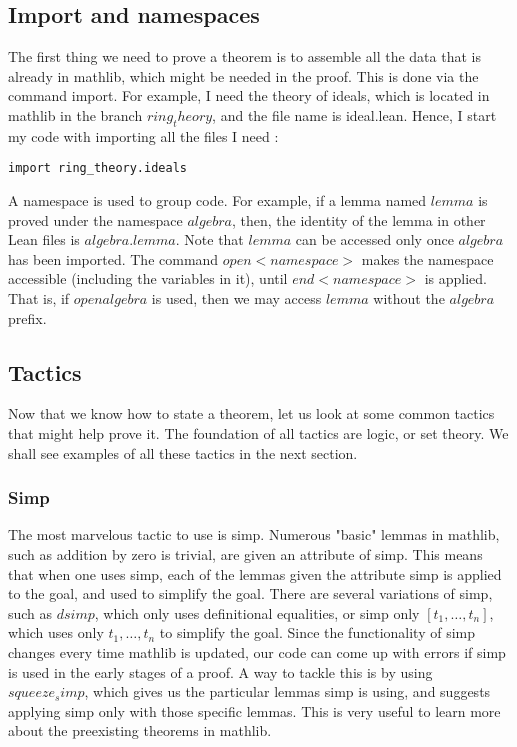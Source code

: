 \documentclass[10pt, a4paper]{article}
\begin{document}
\subsection{Import and namespaces}

The first thing we need to prove a theorem is to assemble all the data that is already in mathlib, which might be needed in the proof. This is done via the command import. For example, I need the theory of ideals, which is located in mathlib in the branch $ring_theory$, and the file name is ideal.lean. Hence, I start my code with importing all the files I need : 

\begin{lstlisting}
import ring_theory.ideals
\end{lstlisting}

A namespace is used to group code. For example, if a lemma named $lemma$ is proved under the namespace $algebra$, then, the identity of the lemma in other Lean files is $algebra.lemma$. Note that $lemma$ can be accessed only once $algebra$ has been imported. The command $open <namespace>$ makes the namespace accessible (including the variables in it), until $end <namespace>$ is applied. That is, if $open algebra$ is used, then we may access $lemma$ without the $algebra$ prefix. \\

\subsection{Tactics}

Now that we know how to state a theorem, let us look at some common tactics that might help prove it. The foundation of all tactics are logic, or set theory. We shall see examples of all these tactics in the next section. \\

\subsubsection{Simp}
The most marvelous tactic to use is simp. Numerous "basic" lemmas in mathlib, such as addition by zero is trivial, are given an attribute of simp. This means that when one uses simp, each of the lemmas given the attribute simp is applied to the goal, and used to simplify the goal. There are several variations of simp, such as $dsimp$, which only uses definitional equalities, or simp only $[t_1, \dots, t_n]$, which uses only $t_1, \dots, t_n$ to simplify the goal. Since the functionality of simp changes every time mathlib is updated, our code can come up with errors if simp is used in the early stages of a proof. A way to tackle this is by using $squeeze_simp$, which gives us the particular lemmas simp is using, and suggests applying simp only with those specific lemmas. This is very useful to learn more about the preexisting theorems in mathlib. \\
\end{document}
